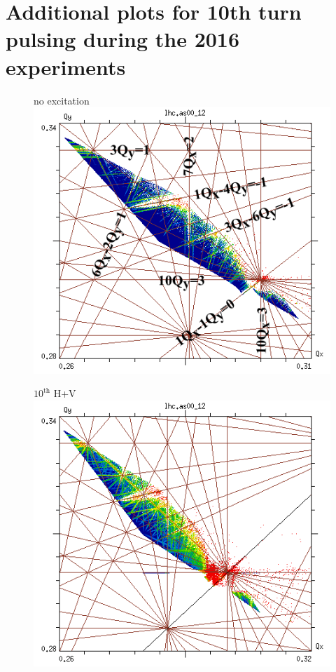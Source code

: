 \documentclass[%
 reprint,
 amsmath,amssymb,
 aps,
prstab,
longbibliography
]{revtex4-1}
\begin{document}
\section{Additional plots for 10th turn pulsing during the 2016 experiments}
\label{app:sec:10}
\begin{figure}[h]
	\begin{minipage}[t]{0.49\linewidth}
		\centering
		no excitation
		\includegraphics[width=1.0\linewidth]{2016injnocolc15o+19_6noerru_dp0_ord10_annotate.png}
	\end{minipage}
	\begin{minipage}[t]{0.49\linewidth}
		\centering
		$10^{\mathrm{th}}$ H+V
		\includegraphics[width=1.0\linewidth]{2016injnocolc15o+19_6noerrut10skhv_dp0_ord10.png}

\end{minipage}
\end{figure}
\end{document}
